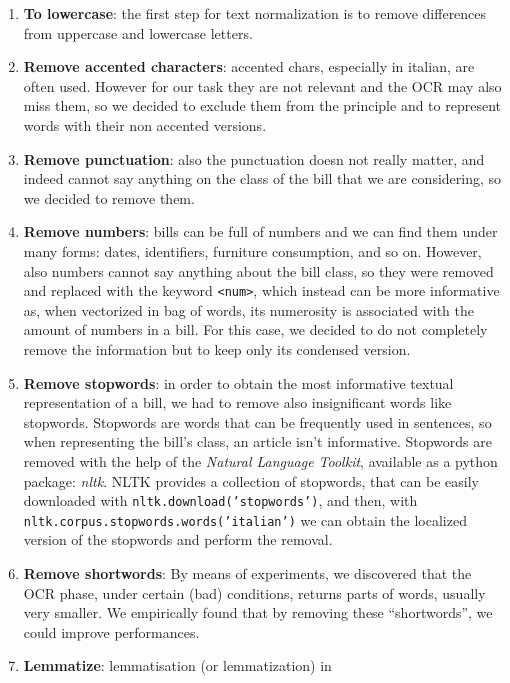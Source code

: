 \documentclass[10pt,twocolumn,letterpaper]{article}
\newcommand\codeinline[1]{\texttt{#1}}  %
\begin{document}
\begin{enumerate}
  \item \textbf{To lowercase}: the first step for text normalization
    is to remove differences from uppercase and lowercase letters.
  \item \textbf{Remove accented characters}: accented chars,
    especially in italian, are often used. However for our task they
    are not relevant and the OCR may also miss them, so we decided to
    exclude them from the principle and to represent words with their
    non accented versions.
  \item \textbf{Remove punctuation}: also the punctuation doesn not
    really matter, and indeed cannot say anything on the class of the
    bill that we are considering, so we decided to remove them.
  \item \textbf{Remove numbers}: bills can be full of numbers and we
    can find them under many forms: dates, identifiers, furniture
    consumption, and so on. However, also numbers cannot say anything
    about the bill class, so they were removed and replaced with the
    keyword \codeinline{<num>}, which instead can be more informative
    as, when vectorized in bag of words, its numerosity is associated
    with the amount of numbers in a bill. For this case, we decided to
    do not completely remove the information but to keep only its
    condensed version.
  \item \textbf{Remove stopwords}: in order to obtain the most
    informative textual representation of a bill, we had to remove
    also insignificant words like stopwords. Stopwords are words that
    can be frequently used in sentences, so when representing the
    bill's class, an article isn't informative. Stopwords are removed
    with the help of the \emph{Natural Language Toolkit}, available as
    a python package: \emph{nltk}. NLTK provides a collection of
    stopwords, that can be easily downloaded with
    \codeinline{nltk.download('stopwords')}, and then, with
    \codeinline{nltk.corpus.stopwords.words('italian')} we can obtain
    the localized version of the stopwords and perform the removal.
  \item \textbf{Remove shortwords}: By means of experiments, we
    discovered that the OCR phase, under certain (bad) conditions,
    returns parts of words, usually very smaller. We empirically found
    that by removing these ``shortwords'', we could improve
    performances.
  \item \textbf{Lemmatize}: lemmatisation (or lemmatization) in

\end{enumerate}
\end{document}
